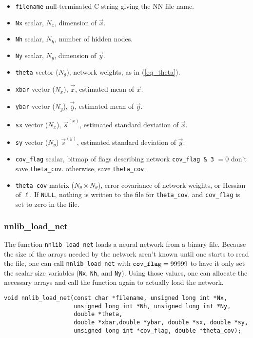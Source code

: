 \documentclass{article}    %
\begin{document}
\begin{itemize}
\item \verb|filename| null-terminated C string giving the NN file name.
\item \verb|Nx| scalar, $N_x$, dimension of $\vec{x}$.
\item \verb|Nh| scalar, $N_h$, number of hidden nodes.
\item \verb|Ny| scalar, $N_y$, dimension of $\vec{y}$.
\item \verb|theta| vector ($N_{\theta}$), network weights, as in (\ref{eq_theta}).
\item \verb|xbar| vector ($N_x$), $\vec{\bar{x}}$, estimated mean of $\vec{x}$.
\item \verb|ybar| vector ($N_y$), $\vec{\bar{y}}$, estimated mean of $\vec{y}$.
\item \verb|sx| vector ($N_x$), $\vec{s}^{(x)}$, estimated standard deviation of $\vec{x}$.
\item \verb|sy| vector ($N_y$) $\vec{s}^{(y)}$, estimated standard deviation of $\vec{y}$.
\item \verb|cov_flag| scalar, bitmap of flags describing network
  \subitem \verb|cov_flag & 3| $=0$ don't save \verb|theta_cov|.
  \subitem otherwise, save \verb|theta_cov|.
\item \verb|theta_cov| matrix ($N_{\theta} \times N_{\theta}$), error
  covariance of network weights, or Hessian of $\ell$. If \verb|NULL|,
  nothing is written to the file for \verb|theta_cov|, and
  \verb|cov_flag| is set to zero in the file.
\end{itemize}

\subsubsection{nnlib\_load\_net}

The function \verb|nnlib_load_net| loads a neural network from a
binary file. Because the size of the arrays needed by the network
aren't known until one starts to read the file, one can call
\verb|nnlib_load_net| with $\verb|cov_flag|=99999$ to have it only
set the scalar size variables (\verb|Nx|, \verb|Nh|, and \verb|Ny|).
Using those values, one can allocate the necessary arrays and call the
function again to actually load the network.

\begin{verbatim}
void nnlib_load_net(const char *filename, unsigned long int *Nx, 
                    unsigned long int *Nh, unsigned long int *Ny, 
                    double *theta,
                    double *xbar,double *ybar, double *sx, double *sy,
                    unsigned long int *cov_flag, double *theta_cov);
\end{verbatim}
\end{document}
